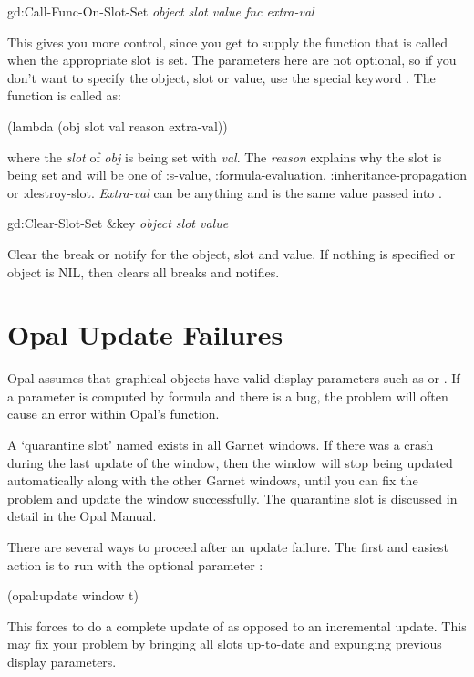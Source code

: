 \begin{programexample}
gd:Call-Func-On-Slot-Set {\it object  slot  value  fnc  extra-val} \value{function}
\end{programexample}
This gives you more control, since you get to supply the function
that is called when the appropriate slot is set.   The parameters here are not
optional, so if you don't want to specify the object, slot or value,
use the special keyword .  The function  is called as:
\begin{programexample}
(lambda (obj slot val reason extra-val))
\end{programexample}
where the {\it slot} of {\it obj} is being set with {\it val}.  The
{\it reason} explains why the slot is being set and will be one
of {\sc :s-value}, {\sc :formula-evaluation}, {\sc :inheritance-propagation} or
{\sc :destroy-slot}.  {\it Extra-val} can be anything
and is the same value passed into .

\begin{programexample}
gd:Clear-Slot-Set \&key {\it object  slot  value} \value{function}
\end{programexample}
Clear the break or notify for the object, slot and value.  If nothing is
specified or object is NIL, then clears all breaks and notifies.



\chapter{Opal Update Failures}
\label{fix-up-windows}
Opal assumes that graphical objects have valid display parameters
such as  or .  If a parameter is computed
by formula and there is a bug, the problem will often cause an
error within Opal's  function.

A `quarantine slot' named  exists in all Garnet windows.
If there was a crash during the last update of the window, then the window
will stop being updated automatically along with the other Garnet windows,
until you can fix the problem and update the window successfully.  The
quarantine slot is discussed in detail in the Opal Manual.

There are several ways to proceed after an update failure.
The first and easiest action is to run  with
the optional parameter :
\begin{programexample}
(opal:update window t)
\end{programexample}
This forces  to do a complete update of 
as opposed to an incremental update.  This may fix your problem
by bringing all slots up-to-date and expunging previous display
parameters.

